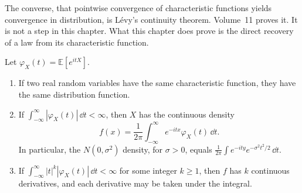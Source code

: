 The converse, that pointwise convergence of characteristic functions yields convergence in distribution, is L\'evy's continuity theorem. Volume~11 proves it. It is not a step in this chapter. What this chapter does prove is the direct recovery of a law from its characteristic function.

\begin{theorem}\label{thm:inversion}
Let $\varphi_X(t)=\mathbb E[e^{itX}]$.
\begin{enumerate}[label=(\alph*)]
\item If two real random variables have the same characteristic function, they have the same distribution function.
\item If $\int_{-\infty}^{\infty}|\varphi_X(t)|\,\dd t<\infty$, then $X$ has the continuous density
\[
 f(x)=\frac1{2\pi}\int_{-\infty}^{\infty}e^{-itx}\varphi_X(t)\,\dd t.
\]
In particular, the $N(0,\sigma^2)$ density, for $\sigma>0$, equals $\frac1{2\pi}\int e^{-ity}e^{-\sigma^2 t^2/2}\,\dd t$.
\item If $\int_{-\infty}^{\infty}|t|^k|\varphi_X(t)|\,\dd t<\infty$ for some integer $k\ge1$, then $f$ has $k$ continuous derivatives, and each derivative may be taken under the integral.
\end{enumerate}
\end{theorem}
